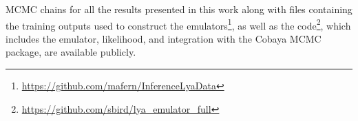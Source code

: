 

MCMC chains for all the results presented in this work along with files containing the training outputs used to construct the emulators\footnote{\url{https://github.com/mafern/InferenceLyaData}}, as well as the code\footnote{\url{https://github.com/sbird/lya_emulator_full}}, which includes the emulator, likelihood, and integration with the Cobaya MCMC package, are available publicly.



